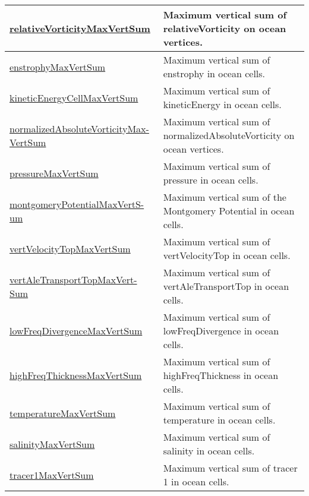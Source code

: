 {\begin{center}
\begin{longtable}{| p{2.0in} | p{4.0in} |}
	\hline
	\hyperref[subsec:var_sec_amGlobalStats_relativeVorticityMaxVertSum]{relativeVorticityMaxVertSum} & Maximum vertical sum of relativeVorticity on ocean vertices. \\
	\hline
	\hyperref[subsec:var_sec_amGlobalStats_enstrophyMaxVertSum]{enstrophyMaxVertSum} & Maximum vertical sum of enstrophy in ocean cells. \\
	\hline
	\hyperref[subsec:var_sec_amGlobalStats_kineticEnergyCellMaxVertSum]{kineticEnergyCellMaxVertSum} & Maximum vertical sum of kineticEnergy in ocean cells. \\
	\hline
	\hyperref[subsec:var_sec_amGlobalStats_normalizedAbsoluteVorticityMaxVertSum]{normalizedAbsoluteVorticityMax-}\hyperref[subsec:var_sec_amGlobalStats_normalizedAbsoluteVorticityMaxVertSum]{VertSum}  & Maximum vertical sum of normalizedAbsoluteVorticity on ocean vertices. \\
	\hline
	\hyperref[subsec:var_sec_amGlobalStats_pressureMaxVertSum]{pressureMaxVertSum} & Maximum vertical sum of pressure in ocean cells. \\
	\hline
	\hyperref[subsec:var_sec_amGlobalStats_montgomeryPotentialMaxVertSum]{montgomeryPotentialMaxVertS-}\hyperref[subsec:var_sec_amGlobalStats_montgomeryPotentialMaxVertSum]{um}  & Maximum vertical sum of the Montgomery Potential in ocean cells. \\
	\hline
	\hyperref[subsec:var_sec_amGlobalStats_vertVelocityTopMaxVertSum]{vertVelocityTopMaxVertSum} & Maximum vertical sum of vertVelocityTop in ocean cells. \\
	\hline
	\hyperref[subsec:var_sec_amGlobalStats_vertAleTransportTopMaxVertSum]{vertAleTransportTopMaxVert-}\hyperref[subsec:var_sec_amGlobalStats_vertAleTransportTopMaxVertSum]{Sum}  & Maximum vertical sum of vertAleTransportTop in ocean cells. \\
	\hline
	\hyperref[subsec:var_sec_amGlobalStats_lowFreqDivergenceMaxVertSum]{lowFreqDivergenceMaxVertSum} & Maximum vertical sum of lowFreqDivergence in ocean cells. \\
	\hline
	\hyperref[subsec:var_sec_amGlobalStats_highFreqThicknessMaxVertSum]{highFreqThicknessMaxVertSum} & Maximum vertical sum of highFreqThickness in ocean cells. \\
	\hline
	\hyperref[subsec:var_sec_amGlobalStats_temperatureMaxVertSum]{temperatureMaxVertSum} & Maximum vertical sum of temperature in ocean cells. \\
	\hline
	\hyperref[subsec:var_sec_amGlobalStats_salinityMaxVertSum]{salinityMaxVertSum} & Maximum vertical sum of salinity in ocean cells. \\
	\hline
	\hyperref[subsec:var_sec_amGlobalStats_tracer1MaxVertSum]{tracer1MaxVertSum} & Maximum vertical sum of tracer 1 in ocean cells. \\
	\hline
\end{longtable}
\end{center}
}
